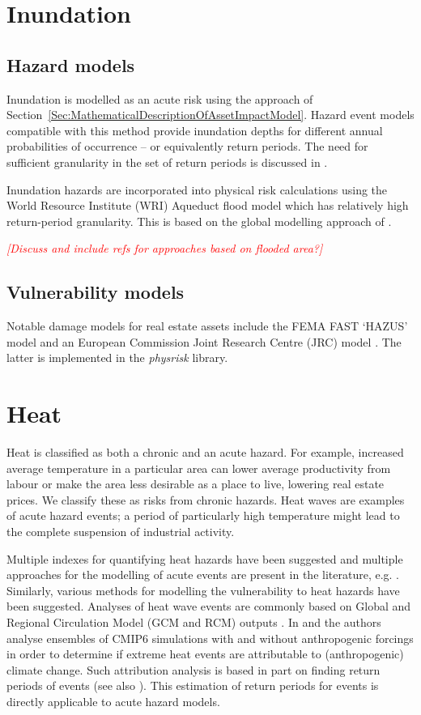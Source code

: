 \documentclass[a4paper,11pt]{extarticle} %
\theoremstyle{definition}
\begin{document}
\section{Inundation}
\subsection{Hazard models}
Inundation is modelled as an acute risk using the approach of Section~\ref{Sec:MathematicalDescriptionOfAssetImpactModel}. Hazard event models compatible with this method provide inundation depths for different annual probabilities of occurrence -- or equivalently return periods. The need for sufficient granularity in the set of return periods is discussed in \cite{WardEtAl:2011}.

Inundation hazards are incorporated into physical risk calculations using the World Resource Institute (WRI) Aqueduct flood model \cite{WardEtAl:2020} which has relatively high return-period granularity. This is based on the global modelling approach of \cite{WardEtAl:2013}.

{\textcolor{red}{\emph{[Discuss and include refs for approaches based on flooded area?]}}}

\subsection{Vulnerability models}
Notable damage models for real estate assets include the FEMA FAST `HAZUS' model \cite{ScawthornEtAl:2006} and an European Commission Joint Research Centre (JRC) model \cite{HuizingaEtAl:2017}. The latter is implemented in the \emph{physrisk} library.


\section{Heat}

Heat is classified as both a chronic and an acute hazard.  For example, increased average temperature in a particular area can lower average productivity from labour or make the area less desirable as a place to live, lowering real estate prices. We classify these as risks from chronic hazards. Heat waves are examples of acute hazard events; a period of particularly high temperature might lead to the complete suspension of industrial activity.

Multiple indexes for quantifying heat hazards have been suggested and multiple approaches for the modelling of acute events are present in the literature, e.g. \cite{MazdiyasniEtAl:2019}. Similarly, various methods for modelling the vulnerability to heat hazards have been suggested. Analyses of heat wave events are commonly based on Global and Regional Circulation Model (GCM and RCM) outputs \cite{DosioEtAl:2018}. In \cite{Christidis:2021} and \cite{Christidis:2013} the authors analyse ensembles of CMIP6 simulations with and without anthropogenic forcings in order to determine if extreme heat events are attributable to (anthropogenic) climate change. Such attribution analysis is based in part on finding return periods of events (see also \cite{StottEtAl:2016}). This estimation of return periods for events is directly applicable to acute hazard models.
\end{document}
